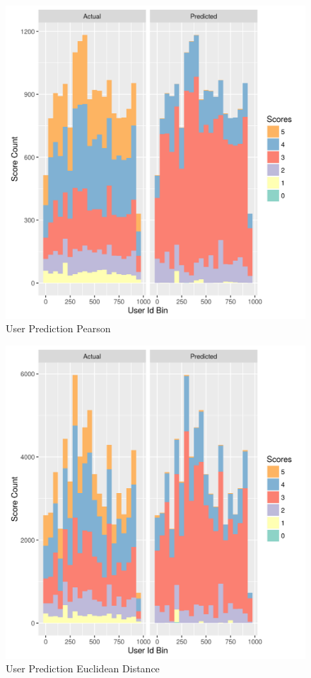 \documentclass[11pt]{article}
\begin{document}
\begin{figure}[H]
\centering
\includegraphics[scale=0.8]{pearson_predicted_buser.png}
\caption{User Prediction Pearson}
\label{fig:q2_p}
\end{figure}
\begin{figure}[H]
\centering
\includegraphics[scale=0.8]{euclid_predicted_buser.png}
\caption{User Prediction Euclidean Distance}
\label{fig:q2_u}
\end{figure}
\end{document}
